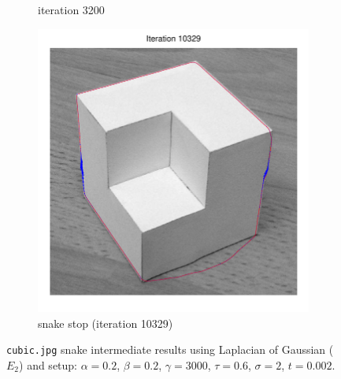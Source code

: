 \documentclass[11pt,a4paper]{article}
\begin{document}
\begin{figure}[H]
\begin{subfigure}[t]{0.24\textwidth}
        \caption{iteration 3200}
        \label{fig:cubic_log_3200}
    \end{subfigure}
    \begin{subfigure}[t]{0.24\textwidth}
        \includegraphics[width=\textwidth]{src/images/cubic_log_10329.pdf}
        \caption{snake stop (iteration 10329)}
        \label{fig:cubic_log_end}
    \end{subfigure}
    \caption{\texttt{cubic.jpg} snake intermediate results using Laplacian of
    Gaussian ($E_2$) and setup: $\alpha
= 0.2$, $\beta = 0.2$, $\gamma = 3000$, $\tau = 0.6$, $\sigma = 2$, $t = 0.002$.}
    \label{fig:cubic_log_intermediate}
\end{figure}
%
\end{document}
